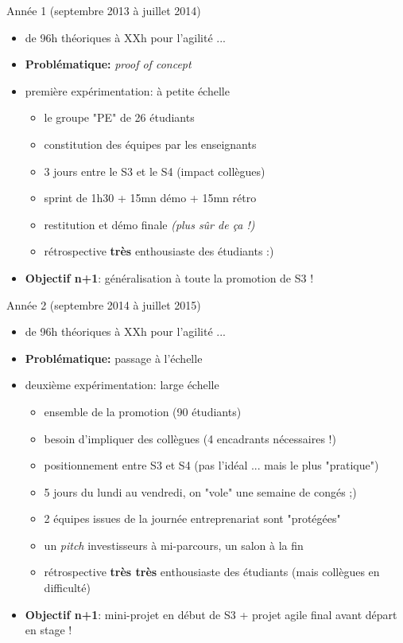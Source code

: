 \documentclass{beamer}
\begin{document}
\begin{frame}{Année 1 (septembre 2013 à juillet 2014)}
  \begin{itemize}
    \item de 96h théoriques à XXh pour l'agilité ...
    \item \textbf{Problématique:} \emph{proof of concept}
    \item première expérimentation: à petite échelle
        \begin{itemize}
          \item le groupe "PE" de 26 étudiants
          \item constitution des équipes par les enseignants
          \item 3 jours entre le S3 et le S4 (impact collègues)
          \item sprint de 1h30 + 15mn démo + 15mn rétro
          \item restitution et démo finale \emph{(plus sûr de ça !)}
          \item rétrospective \textbf{très} enthousiaste des étudiants :)
        \end{itemize}
    \item \textbf{Objectif n+1}: généralisation à toute la promotion de S3 !
  \end{itemize}
\end{frame}

\begin{frame}{Année 2 (septembre 2014 à juillet 2015)}
  \begin{itemize}
    \item de 96h théoriques à XXh pour l'agilité ...
    \item \textbf{Problématique:} passage à l'échelle
    \item deuxième expérimentation: large échelle
      \begin{itemize}
        \item ensemble de la promotion (90 étudiants)
        \item besoin d'impliquer des collègues (4 encadrants nécessaires !)
        \item positionnement entre S3 et S4 (pas l'idéal ... mais le plus "pratique")
        \item 5 jours du lundi au vendredi, on "vole" une semaine de congés ;)
        \item 2 équipes issues de la journée entreprenariat sont "protégées"
        \item un \emph{pitch} investisseurs à mi-parcours, un salon à la fin
        \item rétrospective \textbf{très très} enthousiaste des étudiants (mais collègues en difficulté)
      \end{itemize}
      \item \textbf{Objectif n+1}: mini-projet en début de S3 + projet agile final avant départ en stage !
  \end{itemize}
\end{frame}
\end{document}
